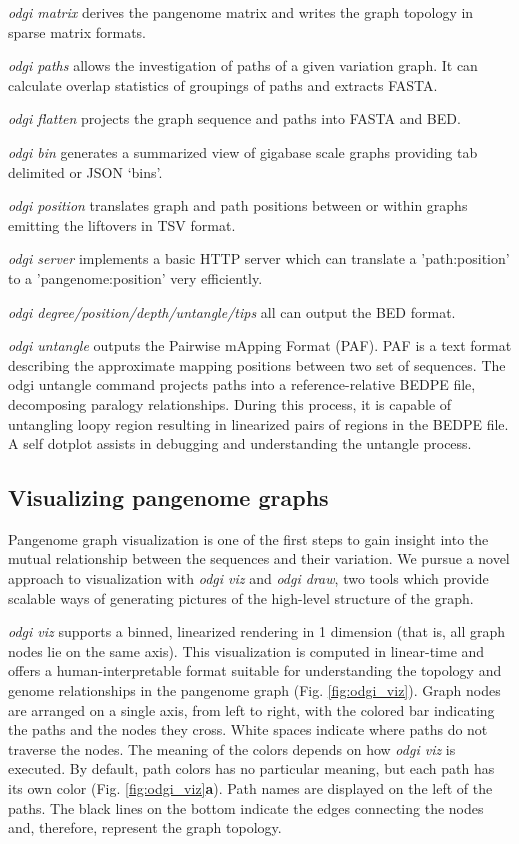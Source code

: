 \documentclass{bioinfo}
\begin{document}
\textit{odgi matrix} derives the pangenome matrix and writes the graph topology in sparse matrix formats.

\textit{odgi paths} allows the investigation of paths of a given variation graph. It can calculate overlap statistics of groupings of paths and extracts FASTA.

\textit{odgi flatten} projects the graph sequence and paths into FASTA and BED.

\textit{odgi bin} generates a summarized view of gigabase scale graphs providing tab delimited or JSON `bins'.

\textit{odgi position} translates graph and path positions between or within graphs emitting the liftovers in TSV format.

\textit{odgi server} implements a basic HTTP server which can translate a 'path:position' to a 'pangenome:position' very efficiently.

\textit{odgi degree/position/depth/untangle/tips} all can output the BED format.

\textit{odgi untangle} outputs the Pairwise mApping Format (PAF). PAF is a text format describing the approximate mapping positions between two set of sequences.
The odgi untangle command projects paths into a reference-relative BEDPE file, decomposing paralogy relationships.
During this process, it is capable of untangling loopy region resulting in linearized pairs of regions in the BEDPE file. A self dotplot assists in debugging and understanding the untangle process.


\subsection{Visualizing pangenome graphs}
\label{sec:viz}


Pangenome graph visualization is one of the first steps to gain insight into the mutual relationship between the sequences and their variation.
We pursue a novel approach to visualization with \textit{odgi viz} and \textit{odgi draw}, two tools which provide scalable ways of generating pictures of the high-level structure of the graph.

\textit{odgi viz} supports a binned, linearized rendering in 1 dimension (that is, all graph nodes lie on the same axis).
This visualization is computed in linear-time and offers a human-interpretable format suitable for understanding the topology and genome relationships in the pangenome graph (Fig. \ref{fig:odgi_viz}).
Graph nodes are arranged on a single axis, from left to right, with the colored bar indicating the paths and the nodes they cross.
White spaces indicate where paths do not traverse the nodes.
The meaning of the colors depends on how \textit{odgi viz} is executed.
By default, path colors has no particular meaning, but each path has its own color (Fig. \ref{fig:odgi_viz}\textbf{a}).
Path names are displayed on the left of the paths.
The black lines on the bottom indicate the edges connecting the nodes and, therefore, represent the graph topology.
\end{document}
